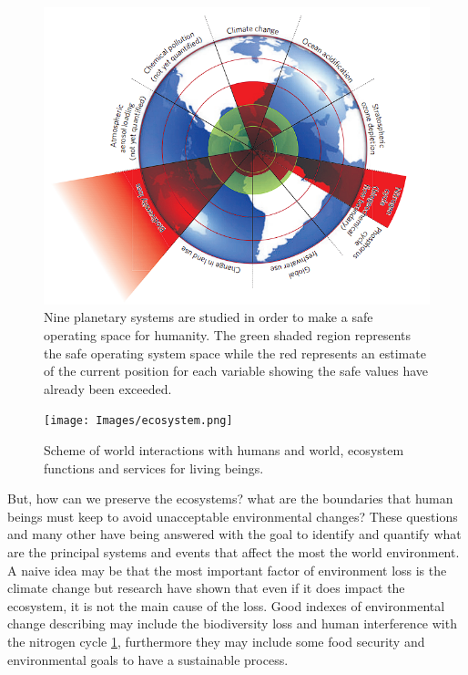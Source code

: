 \begin{minipage}{0.48\linewidth}
\begin{figure}[H]
    \centering
    \includegraphics[width=\linewidth]{Images/biodiversity_loss.png}
    \caption{Nine planetary systems are studied in order to make a safe operating space for humanity. The green shaded region represents the safe operating system space while the red represents an estimate of the current position for each variable showing the safe values have already been exceeded.\cite{save_space}}
    \label{fig:biodiversity_loss}
\end{figure}
\end{minipage} \hfill
\begin{minipage}{0.45\linewidth}
\begin{figure}[H]
    \centering
    \texttt{[image: Images/ecosystem.png]}
    \caption{Scheme of world interactions with humans and world, ecosystem functions and services for living beings. \cite{Cardinale2012}}
    \label{fig:ecosystem}
\end{figure}
\end{minipage}
\vspace{15pt}

But, how can we preserve the ecosystems? what are the boundaries that human beings must keep to avoid unacceptable environmental changes? These questions and many other have being answered with the goal to identify and quantify what are the principal systems and events that affect the most the world environment. A naive idea may be that the most important factor of environment loss is the climate change but research have shown that even if it does impact the ecosystem, it is not the main cause of the loss. Good indexes of  environmental change describing may include the biodiversity loss and  human
interference with the nitrogen cycle \ref{fig:biodiversity_loss}, furthermore they may include some food security and environmental goals to have a sustainable process.    

